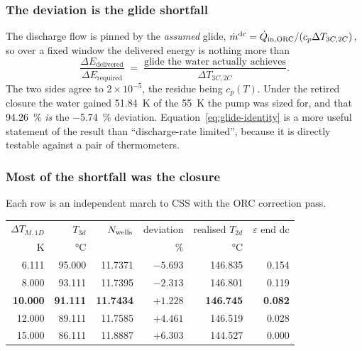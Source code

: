 \subsubsection*{The deviation is the glide shortfall}

The discharge flow is pinned by the \emph{assumed} glide,
$\dot m^{\mathrm{dc}}=\dot Q_{\mathrm{in,ORC}}/(c_{p}\Delta T_{3C,2C})$, so over a
fixed window the delivered energy is nothing more than
\begin{equation}
  \frac{\Delta E_{\mathrm{delivered}}}{\Delta E_{\mathrm{required}}}
  \;=\;
  \frac{\text{glide the water actually achieves}}{\Delta T_{3C,2C}} .
  \label{eq:glide-identity}
\end{equation}
The two sides agree to $2\times10^{-5}$, the residue being $c_{p}(T)$. Under the
retired closure the water gained \SI{51.84}{\kelvin} of the \SI{55}{\kelvin} the
pump was sized for, and that \SI{94.26}{\percent} \emph{is} the
\SI{-5.74}{\percent} deviation. Equation~\eqref{eq:glide-identity} is a more
useful statement of the result than ``discharge-rate limited'', because it is
directly testable against a pair of thermometers.

\subsubsection*{Most of the shortfall was the closure}

Each row is an independent march to CSS with the ORC correction pass.

\begin{center}
\begin{tabular}{@{}r r r r r r@{}}
\toprule
$\Delta T_{M,1D}$ & $T_{3d}$ & $N_{\mathrm{wells}}$ & deviation & realised $T_{2d}$
 & $\varepsilon$ end dc \\
\si{\kelvin} & \si{\celsius} & & \si{\percent} & \si{\celsius} & \\
\midrule
6.111 & 95.000 & 11.7371 & $-5.693$ & 146.835 & 0.154 \\
8.000 & 93.111 & 11.7395 & $-2.313$ & 146.801 & 0.119 \\
\textbf{10.000} & \textbf{91.111} & \textbf{11.7434} & $\mathbf{+1.228}$
 & \textbf{146.745} & \textbf{0.082} \\
12.000 & 89.111 & 11.7585 & $+4.461$ & 146.519 & 0.028 \\
15.000 & 86.111 & 11.8887 & $+6.303$ & 144.527 & 0.000 \\
\bottomrule
\end{tabular}
\end{center}

